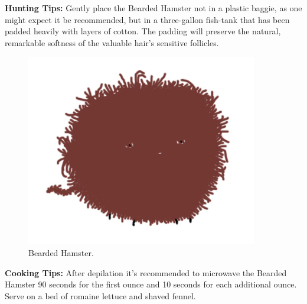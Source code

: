 \documentclass[10pt,twoside,openright]{memoir}
\begin{document}
\vspace{1em}
\noindent
\textbf{Hunting Tips:} Gently place the Bearded Hamster not in a plastic baggie, 
as one might expect it be recommended, but in a three-gallon fish-tank that 
has been padded heavily with layers of cotton. The padding will preserve the 
natural, remarkable softness of the valuable hair's sensitive follicles.

\begin{figure}[ht!]                                                              
\begin{center}                                                                  
\includegraphics[width=0.9\textwidth]{img/bearded}                         
\end{center}                                                                    
\caption*{Bearded Hamster.}                                               
\end{figure}


\vspace{1em}
\noindent
\textbf{Cooking Tips:} After depilation it's recommended to microwave the Bearded
Hamster 90 seconds for the first ounce and 10 seconds for each additional ounce.
Serve on a bed of romaine lettuce and shaved fennel.
\end{document}
